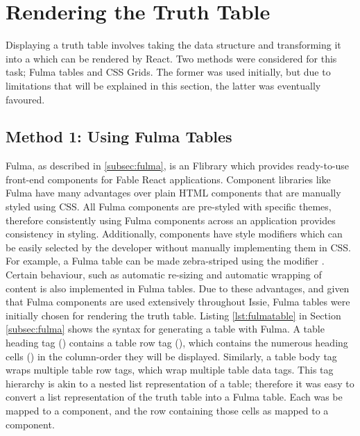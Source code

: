 \section{Rendering the Truth Table}
Displaying a truth table involves taking the  data structure and transforming it into a  which can be rendered by React. Two methods were considered for this task; Fulma tables and CSS Grids. The former was used initially, but due to limitations that will be explained in this section, the latter was eventually favoured.

\subsection{Method 1: Using Fulma Tables}
Fulma, as described in \ref{subsec:fulma}, is an F\fsharp library which provides ready-to-use front-end components for Fable React applications. Component libraries like Fulma have many advantages over plain HTML components that are manually styled using CSS. All Fulma components are pre-styled with specific themes, therefore consistently using Fulma components across an application provides consistency in styling. Additionally, components have style modifiers which can be easily selected by the developer without manually implementing them in CSS. For example, a Fulma table can be made zebra-striped using the  modifier \cite{fulmatable}. Certain behaviour, such as automatic re-sizing and automatic wrapping of content is also implemented in Fulma tables. Due to these advantages, and given that Fulma components are used extensively throughout Issie, Fulma tables were initially chosen for rendering the truth table.
Listing \ref{lst:fulmatable} in Section \ref{subsec:fulma} shows the syntax for generating a table with Fulma. A table heading tag () contains a table row tag (), which contains the numerous heading cells () in the column-order they will be displayed. Similarly, a table body  tag wraps multiple table row tags, which wrap multiple table data  tags. This tag hierarchy is akin to a nested list representation of a table; therefore it was easy to convert a list representation of the truth table into a Fulma table. Each  was be mapped to a  component, and the row containing those cells as mapped to a  component.

